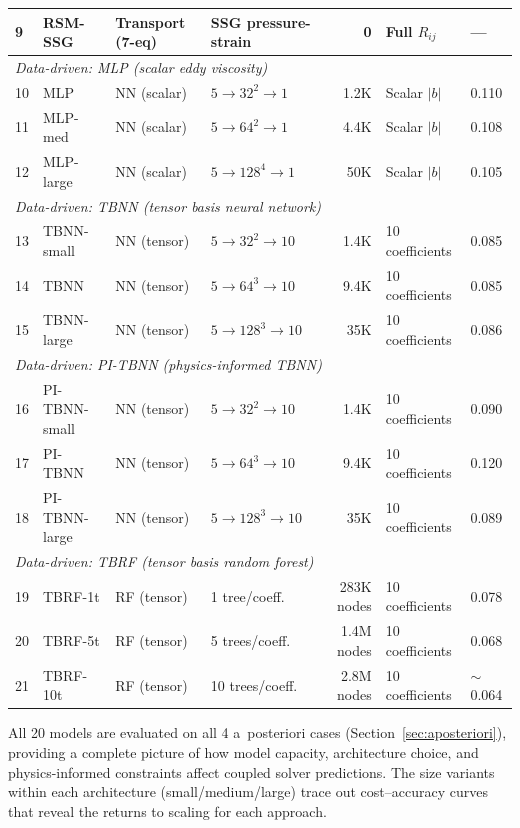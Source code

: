 \begin{table}[htbp]
\begin{tabular}{llllrll}
9  & RSM-SSG            & Transport (7-eq) & SSG pressure-strain & 0 & Full $R_{ij}$ & --- \\
\midrule
\multicolumn{7}{l}{\textit{Data-driven: MLP (scalar eddy viscosity)}} \\
10 & MLP                & NN (scalar) & $5 \to 32^2 \to 1$ & 1.2K & Scalar $|b|$ & 0.110 \\
11 & MLP-med            & NN (scalar) & $5 \to 64^2 \to 1$ & 4.4K & Scalar $|b|$ & 0.108 \\
12 & MLP-large          & NN (scalar) & $5 \to 128^4 \to 1$ & 50K & Scalar $|b|$ & 0.105 \\
\midrule
\multicolumn{7}{l}{\textit{Data-driven: TBNN (tensor basis neural network)}} \\
13 & TBNN-small         & NN (tensor) & $5 \to 32^2 \to 10$ & 1.4K & 10 coefficients & 0.085 \\
14 & TBNN               & NN (tensor) & $5 \to 64^3 \to 10$ & 9.4K & 10 coefficients & 0.085 \\
15 & TBNN-large         & NN (tensor) & $5 \to 128^3 \to 10$ & 35K & 10 coefficients & 0.086 \\
\midrule
\multicolumn{7}{l}{\textit{Data-driven: PI-TBNN (physics-informed TBNN)}} \\
16 & PI-TBNN-small      & NN (tensor) & $5 \to 32^2 \to 10$ & 1.4K & 10 coefficients & 0.090 \\
17 & PI-TBNN            & NN (tensor) & $5 \to 64^3 \to 10$ & 9.4K & 10 coefficients & 0.120 \\
18 & PI-TBNN-large      & NN (tensor) & $5 \to 128^3 \to 10$ & 35K & 10 coefficients & 0.089 \\
\midrule
\multicolumn{7}{l}{\textit{Data-driven: TBRF (tensor basis random forest)}} \\
19 & TBRF-1t            & RF (tensor) & 1 tree/coeff.  & 283K nodes & 10 coefficients & 0.078 \\
20 & TBRF-5t            & RF (tensor) & 5 trees/coeff. & 1.4M nodes & 10 coefficients & 0.068 \\
21 & TBRF-10t           & RF (tensor) & 10 trees/coeff. & 2.8M nodes & 10 coefficients & $\sim$0.064 \\
\bottomrule
\end{tabular}
\end{table}

All 20 models are evaluated on all 4 a~posteriori cases (Section~\ref{sec:aposteriori}), providing a complete picture of how model capacity, architecture choice, and physics-informed constraints affect coupled solver predictions.
The size variants within each architecture (small/medium/large) trace out cost--accuracy curves that reveal the returns to scaling for each approach.


